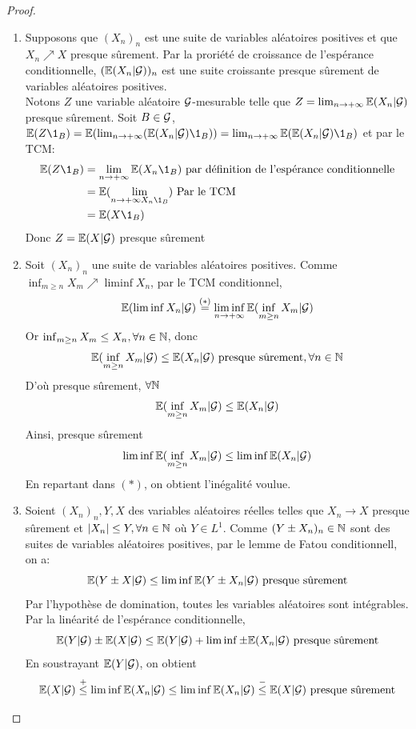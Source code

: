 \documentclass[]{report}
\begin{document}
    \begin{proof}
        \begin{enumerate}
            \item Supposons que $(X_n)_n$ est une suite de variables aléatoires positives et que $X_n\nearrow X$ presque sûrement. Par la proriété de croissance de l'espérance conditionnelle, $(\mathbb{E}(X_n|\mathcal{G}))_n$ est une suite croissante presque sûrement de variables aléatoires positives.\\
            Notons $Z$ une variable aléatoire $\mathcal{G}$-mesurable telle que $Z=\lim_{n\to +\infty}\mathbb{E} (X_n|\mathcal{G})$ presque sûrement. Soit $B\in \mathcal{G}$, $\Ea (Z\1_B)=\Ea (\lim_{n\to +\infty}(\Ea(X_n|\Gr)\1_B))=\lim_{n\to +\infty} \Ea(\Ea(X_n|\Gr)\1_B)$ et par le TCM:
            \begin{align*}
                \Ea (Z\1_B)&=\lim_{n\to +\infty} \Ea(X_n \1_B) \text{ par définition de l'espérance conditionnelle}\\
                &=\Ea(\lim_{n\to +\infty X_n \1_B})\text{ Par le TCM}\\
                &= \Ea(X \1_B)
            \end{align*}
            Donc $Z=\mathbb{E}(X|\mathcal{G})$ presque sûrement
            \item Soit $(X_n)_n$ une suite de variables aléatoires positives. Comme $\inf_{m\ge n}X_m \nearrow \liminf X_n$, par le TCM conditionnel,
            \[\mathbb{E} (\liminf X_n|\mathcal{G})\overset{(*)}{=}\liminf_{n\to +\infty}\mathbb{E}(\inf_{m\ge n}X_m|\mathcal{G})\]
            Or $\inf_{m\ge n} X_m \le X_n,\forall n\in \mathbb{N}$, donc
            \[\mathbb{E} (\inf_{m\ge n} X_m|\mathcal{G})\le \mathbb{E}(X_n|\mathcal{G})\text{ presque sûrement}, \forall n\in \mathbb{N}\]
            D'où presque sûrement, $\forall \mathbb{N}$
            \[\mathbb{E}(\inf_{m\ge n}X_m|\mathcal{G})\le \mathbb{E}(X_n|\mathcal{G})\]
            Ainsi, presque sûrement
            \[\liminf \mathbb{E}(\inf_{m\ge n}X_m|\mathcal{G})\le \liminf \mathbb{E}(X_n |\mathcal{G})\]
            En repartant dans $(*)$, on obtient l'inégalité voulue.
            \item Soient $(X_n)_n, Y, X$ des variables aléatoires réelles telles que $X_n\to X$ presque sûrement et $|X_n|\le Y,\forall n\in \mathbb{N}$ où $Y\in L^1$. Comme $(Y\pm X_n)_n\in \mathbb{N}$ sont des suites de variables aléatoires positives, par le lemme de Fatou conditionnell, on a:
            \[\mathbb{E}(Y\pm X|\mathcal{G})\le \liminf \mathbb{E}(Y\pm X_n|\mathcal{G})\text{ presque sûrement}\]
            Par l'hypothèse de domination, toutes les variables aléatoires sont intégrables. Par la linéarité de l'espérance conditionnelle,
            \[\mathbb{E}(Y|\mathcal{G})\pm \mathbb{E}(X|\mathcal{G})\le \mathbb{E}(Y|\mathcal{G})+ \liminf \pm \mathbb{E}(X_n|\mathcal{G})\text{ presque sûrement}\]
            En soustrayant $\mathbb{E}(Y|\mathcal{G})$, on obtient
            \[\mathbb{E}(X|\mathcal{G})\overset{+}{\le} \liminf \mathbb{E}(X_n|\mathcal{G})\le \liminf \mathbb{E} (X_n|\mathcal{G})\overset{-}{\le} \mathbb{E}(X|\mathcal{G})\text{ presque sûrement}\]
        \end{enumerate}
    \end{proof}
\end{document}
